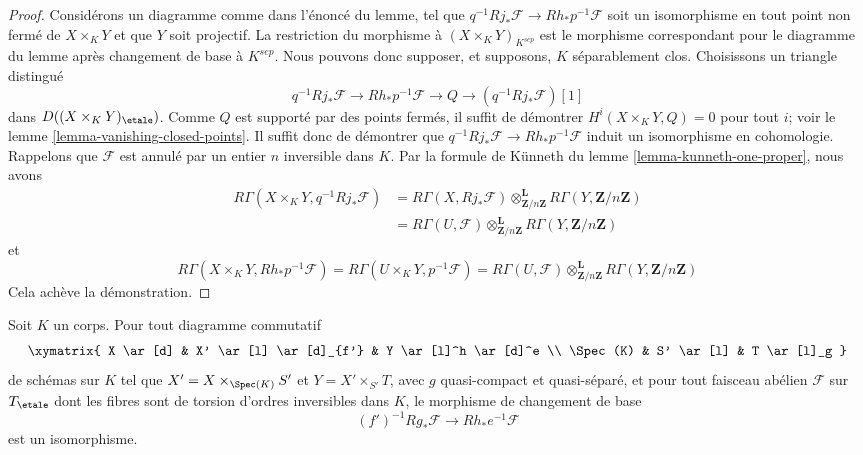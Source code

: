 \begin{proof}
\medskip\noindent
Considérons un diagramme comme dans l'énoncé du lemme, tel que
$q^{-1}Rj_*\mathcal{F} \to Rh_*p^{-1}\mathcal{F}$
soit un isomorphisme en tout point non fermé de $X \times_K Y$
et que $Y$ soit projectif.
La restriction du morphisme à $(X \times_K Y)_{K^{sep}}$
est le morphisme correspondant pour le diagramme du lemme
après changement de base à $K^{sep}$. Nous pouvons donc supposer, et supposons, $K$
séparablement clos. Choisissons un triangle distingué
$$
q^{-1}Rj_*\mathcal{F} \to Rh_*p^{-1}\mathcal{F} \to Q \to
(q^{-1}Rj_*\mathcal{F})[1]
$$
dans $D((X \times_K Y)_\etale)$. Comme $Q$ est supporté par des
points fermés, il suffit de démontrer
$H^i(X \times_K Y, Q) = 0$ pour tout $i$; voir le
lemme \ref{lemma-vanishing-closed-points}.
Il suffit donc de démontrer que
$q^{-1}Rj_*\mathcal{F} \to Rh_*p^{-1}\mathcal{F}$
induit un isomorphisme en cohomologie. Rappelons que $\mathcal{F}$
est annulé par un entier $n$ inversible dans $K$.
Par la formule de K\"unneth du lemme \ref{lemma-kunneth-one-proper},
nous avons
\begin{align*}
R\Gamma(X \times_K Y, q^{-1}Rj_*\mathcal{F})
&=
R\Gamma(X, Rj_*\mathcal{F})
\otimes_{\mathbf{Z}/n\mathbf{Z}}^\mathbf{L}
R\Gamma(Y, \mathbf{Z}/n\mathbf{Z}) \\
& =
R\Gamma(U, \mathcal{F})
\otimes_{\mathbf{Z}/n\mathbf{Z}}^\mathbf{L}
R\Gamma(Y, \mathbf{Z}/n\mathbf{Z})
\end{align*}
et
$$
R\Gamma(X \times_K Y, Rh_*p^{-1}\mathcal{F}) =
R\Gamma(U \times_K Y, p^{-1}\mathcal{F}) =
R\Gamma(U, \mathcal{F})
\otimes_{\mathbf{Z}/n\mathbf{Z}}^\mathbf{L}
R\Gamma(Y, \mathbf{Z}/n\mathbf{Z})
$$
Cela achève la démonstration.
\end{proof}

\begin{lemma}
\label{lemma-punctual-base-change}
Soit $K$ un corps. Pour tout diagramme commutatif
$$
\xymatrix{
X \ar[d] & X' \ar[l] \ar[d]_{f'} & Y \ar[l]^h \ar[d]^e \\
\Spec(K) & S' \ar[l] & T \ar[l]_g
}
$$
de schémas sur $K$ tel que
$X' = X \times_{\Spec(K)} S'$ et $Y = X' \times_{S'} T$, avec
$g$ quasi-compact et quasi-séparé, et pour tout faisceau abélien
$\mathcal{F}$ sur $T_\etale$ dont les fibres sont de torsion d'ordres
inversibles dans $K$, le morphisme de changement de base
$$
(f')^{-1}Rg_*\mathcal{F}
\longrightarrow
Rh_*e^{-1}\mathcal{F}
$$
est un isomorphisme.
\end{lemma}

